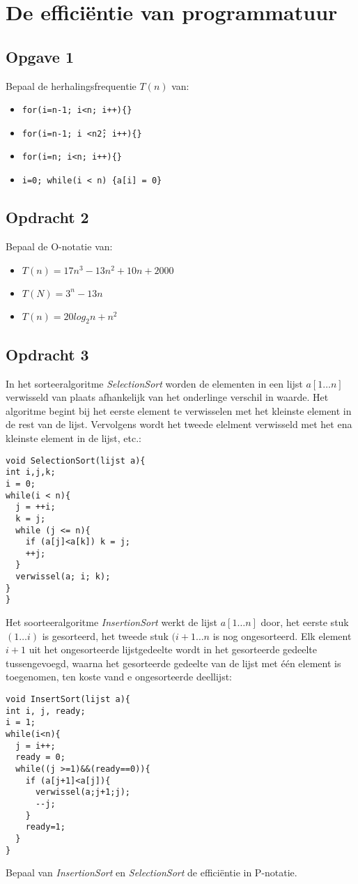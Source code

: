 \chapter{De effici\"{e}ntie van programmatuur}
\section{Opgave 1}
Bepaal de herhalingsfrequentie $T(n)$ van:
  \begin{itemize}
    \item \texttt{for(i=n-1; i<n; i++)\{\}}
    \item \texttt{for(i=n-1; i <n\^2; i++)\{\}}
    \item \texttt{for(i=n; i<n; i++)\{\}}
    \item \texttt{i=0; while(i < n) \{a[i] = 0\}}
  \end{itemize}

\section{Opdracht 2}
Bepaal de O-notatie van:
\begin{itemize}
  \item $T(n)=17n^3-13n^2+10n+2000$
  \item $T(N)=3^n-13n$
  \item $T(n)=20log_2n+n^2$
\end{itemize}

\section{Opdracht 3}
In het sorteeralgoritme \emph{SelectionSort} worden de elementen in een lijst $a[1\ldots{}n]$ verwisseld van plaats afhankelijk van het onderlinge verschil in waarde. Het algoritme begint bij het eerste element te verwisselen met het kleinste element in de rest van de lijst. Vervolgens wordt het tweede elelment verwisseld met het ena kleinste element in de lijst, etc.:
\begin{lstlisting}
void SelectionSort(lijst a){
int i,j,k;
i = 0;
while(i < n){
  j = ++i;
  k = j;
  while (j <= n){
    if (a[j]<a[k]) k = j;
    ++j;
  }
  verwissel(a; i; k);
}
}
\end{lstlisting}
Het soorteeralgoritme \emph{InsertionSort} werkt de lijst $a[1\ldots n]$ door, het eerste stuk $(1\ldots i)$ is gesorteerd, het tweede stuk $(i+1\ldots n$ is nog ongesorteerd.
 Elk element $i+1$ uit het ongesorteerde lijstgedeelte wordt in het gesorteerde gedeelte tussengevoegd, waarna het gesorteerde gedeelte van de lijst met \'{e}\'{e}n element is toegenomen, ten koste vand e ongesorteerde deellijst:
\begin{lstlisting}
void InsertSort(lijst a){
int i, j, ready;
i = 1;
while(i<n){
  j = i++;
  ready = 0;
  while((j >=1)&&(ready==0)){
    if (a[j+1]<a[j]){
      verwissel(a;j+1;j);
      --j;
    }
    ready=1;
  }
}
\end{lstlisting}
Bepaal van \emph{InsertionSort} en \emph{SelectionSort} de effici\"{e}ntie in P-notatie.

